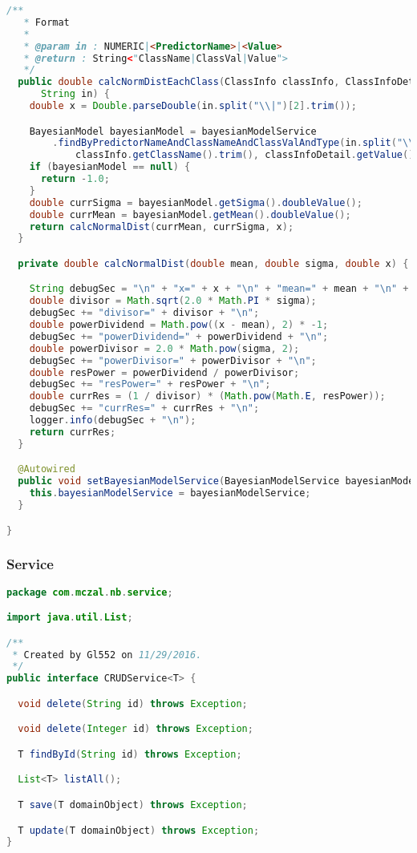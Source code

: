 \begin{lstlisting}[language=Java,basicstyle=\tiny,caption=TestingUtils.java]
  /**
   * Format
   *
   * @param in : NUMERIC|<PredictorName>|<Value>
   * @return : String<"ClassName|ClassVal|Value">
   */
  public double calcNormDistEachClass(ClassInfo classInfo, ClassInfoDetail classInfoDetail,
      String in) {
    double x = Double.parseDouble(in.split("\\|")[2].trim());

    BayesianModel bayesianModel = bayesianModelService
        .findByPredictorNameAndClassNameAndClassValAndType(in.split("\\|")[1].trim(),
            classInfo.getClassName().trim(), classInfoDetail.getValue().trim(), Type.NUMERIC);
    if (bayesianModel == null) {
      return -1.0;
    }
    double currSigma = bayesianModel.getSigma().doubleValue();
    double currMean = bayesianModel.getMean().doubleValue();
    return calcNormalDist(currMean, currSigma, x);
  }

  private double calcNormalDist(double mean, double sigma, double x) {

    String debugSec = "\n" + "x=" + x + "\n" + "mean=" + mean + "\n" + "sigma=" + sigma + "\n";
    double divisor = Math.sqrt(2.0 * Math.PI * sigma);
    debugSec += "divisor=" + divisor + "\n";
    double powerDividend = Math.pow((x - mean), 2) * -1;
    debugSec += "powerDividend=" + powerDividend + "\n";
    double powerDivisor = 2.0 * Math.pow(sigma, 2);
    debugSec += "powerDivisor=" + powerDivisor + "\n";
    double resPower = powerDividend / powerDivisor;
    debugSec += "resPower=" + resPower + "\n";
    double currRes = (1 / divisor) * (Math.pow(Math.E, resPower));
    debugSec += "currRes=" + currRes + "\n";
    logger.info(debugSec + "\n");
    return currRes;
  }

  @Autowired
  public void setBayesianModelService(BayesianModelService bayesianModelService) {
    this.bayesianModelService = bayesianModelService;
  }

}

\end{lstlisting}

\subsubsection{Service}

\begin{lstlisting}[language=Java,basicstyle=\tiny,caption=CRUDService.java]
package com.mczal.nb.service;

import java.util.List;

/**
 * Created by Gl552 on 11/29/2016.
 */
public interface CRUDService<T> {

  void delete(String id) throws Exception;

  void delete(Integer id) throws Exception;

  T findById(String id) throws Exception;

  List<T> listAll();

  T save(T domainObject) throws Exception;

  T update(T domainObject) throws Exception;
}

\end{lstlisting}


